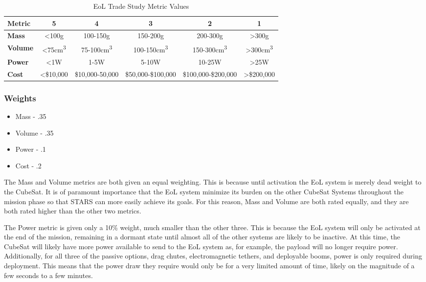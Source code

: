 \documentclass[3p]{elsarticle}
\begin{document}
\begin{table}[H]
\centering
\begin{tabular}{|l|c|c|c|c|c|} 
\hline
    \textbf{Metric} & \textbf{5} & \textbf{4} & \textbf{3} & \textbf{2} & \textbf{1}
    \\
\hline
    \textbf{Mass} & <100g & 100-150g & 150-200g & 200-300g & >300g 
    \\
\hline
    \textbf{Volume} & <75cm\textsuperscript{3} & 75-100cm\textsuperscript{3} & 100-150cm\textsuperscript{3} & 150-300cm\textsuperscript{3} & >300cm\textsuperscript{3} 
    \\
\hline
    \textbf{Power} & <1W & 1-5W & 5-10W & 10-25W & >25W 
    \\
\hline
    \textbf{Cost} & <\$10,000 & \$10,000-50,000 & \$50,000-\$100,000 & \$100,000-\$200,000 & >\$200,000 
    \\

\hline
\end{tabular}
\caption{EoL Trade Study Metric Values}
\label{tbl:EoL_Metric_Scores}
\end{table}
\subsubsection{Weights}
\begin{itemize}
    \item Mass - .35
    \item Volume - .35
    \item Power - .1
    \item Cost - .2
\end{itemize}

The Mass and Volume metrics are both given an equal weighting. This is because until activation the EoL system is merely dead weight to the CubeSat. It is of paramount importance that the EoL system minimize its burden on the other CubeSat Systems throughout the mission phase so that STARS can more easily achieve its goals. For this reason, Mass and Volume are both rated equally, and they are both rated higher than the other two metrics. 

The Power metric is given only a 10\% weight, much smaller than the other three. This is because the EoL system will only be activated at the end of the mission, remaining in a dormant state until almost all of the other systems are likely to be inactive. At this time, the CubeSat will likely have more power available to send to the EoL system as, for example, the payload will no longer require power. Additionally, for all three of the passive options, drag chutes, electromagnetic tethers, and deployable booms, power is only required during deployment. This means that the power draw they require would only be for a very limited amount of time, likely on the magnitude of a few seconds to a few minutes. 
\end{document}
